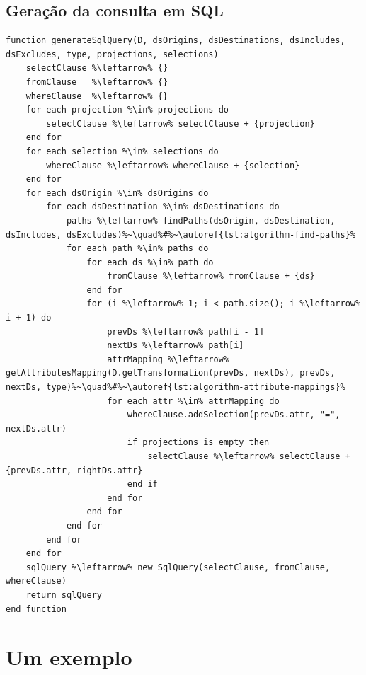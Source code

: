 \subsection{Geração da consulta em SQL}


\begin{minipage}[c]{0.95\textwidth}
\begin{lstlisting}[language=pseudocode,label={lst:algorithm-generate-sql-query},caption={[Geração da consulta em SQL]Geração da consulta na linguagem SQL a partir das especificações do usuário.}]
function generateSqlQuery(D, dsOrigins, dsDestinations, dsIncludes, dsExcludes, type, projections, selections)
    selectClause %\leftarrow% {}
    fromClause   %\leftarrow% {}
    whereClause  %\leftarrow% {}
    for each projection %\in% projections do
        selectClause %\leftarrow% selectClause + {projection}
    end for
    for each selection %\in% selections do
        whereClause %\leftarrow% whereClause + {selection}
    end for
    for each dsOrigin %\in% dsOrigins do
        for each dsDestination %\in% dsDestinations do
            paths %\leftarrow% findPaths(dsOrigin, dsDestination, dsIncludes, dsExcludes)%~\quad%#%~\autoref{lst:algorithm-find-paths}%
            for each path %\in% paths do
                for each ds %\in% path do
                    fromClause %\leftarrow% fromClause + {ds}
                end for                
                for (i %\leftarrow% 1; i < path.size(); i %\leftarrow% i + 1) do
                    prevDs %\leftarrow% path[i - 1]
                    nextDs %\leftarrow% path[i]
                    attrMapping %\leftarrow% getAttributesMapping(D.getTransformation(prevDs, nextDs), prevDs, nextDs, type)%~\quad%#%~\autoref{lst:algorithm-attribute-mappings}%
                    for each attr %\in% attrMapping do
                        whereClause.addSelection(prevDs.attr, "=", nextDs.attr)
                        if projections is empty then
                            selectClause %\leftarrow% selectClause + {prevDs.attr, rightDs.attr}
                        end if
                    end for
                end for
            end for
        end for
    end for
    sqlQuery %\leftarrow% new SqlQuery(selectClause, fromClause, whereClause)
    return sqlQuery
end function
\end{lstlisting}
\end{minipage}

\section{Um exemplo}

